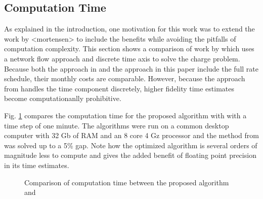 \subsection{Computation Time\label{sec:results:time}} 
As explained in the introduction, one motivation for this work was to extend the work by <mortensen> to include the benefits while avoiding the pitfalls of computation complexity. This section shows a comparison of work by \cite{mortensen_comprehensive_2021} which uses a network flow approach and discrete time axis to solve the charge problem. Because both the approach in \cite{mortensen_comprehensive_2021} and the approach in this paper include the full rate schedule, their monthly costs are comparable. However, because the approach from \cite{mortensen_comprehensive_2021} handles the time component discretely, higher fidelity time estimates become computationanlly prohibitive. 
\par Fig. \ref{fig:timeComparison} compares the computation time for the proposed algorithm with \cite{mortensen_comprehensive_2021} with a time step of one minute. The algorithms were run on a common desktop computer with 32 Gb of RAM and an 8 core 4 Gz processor and the method from \cite{mortensen_comprehensive_2021} was solved up to a 5\% gap. Note how the optimized algorithm is several orders of magnitude less to compute and gives the added benefit of floating point precision in its time estimates.
\begin{figure}
	\centering
	\caption{Comparison of computation time between the proposed algorithm and \cite{mortensen_comprehensive_2021}}
	\label{fig:timeComparison}
\end{figure}







